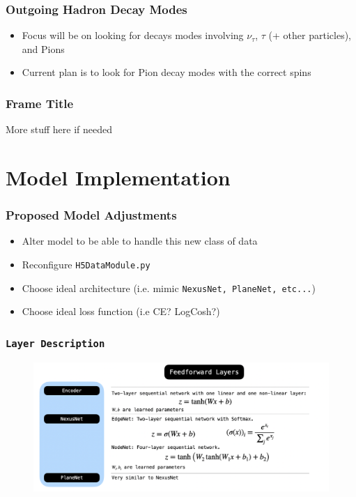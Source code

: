 \documentclass{beamer}
\begin{document}
\begin{frame}
\frametitle{Outgoing Hadron Decay Modes}
	\begin{itemize}
		\item Focus will be on looking for decays modes involving $\nu_{\tau}$, $\tau$ (+ other particles), and Pions
		\item Current plan is to look for Pion decay modes with the correct spins
	\end{itemize}
\end{frame}


\begin{frame}
    \frametitle{Frame Title}
    More stuff here if needed
\end{frame}


\section{Model Implementation}


\begin{frame}
\frametitle{Proposed Model Adjustments}
	\begin{itemize}
		\item Alter model to be able to handle this new class of data

		\item Reconfigure \texttt{H5DataModule.py}
		\item Choose ideal architecture (i.e. mimic \texttt{NexusNet, PlaneNet, etc...})
		\item Choose ideal loss function (i.e CE? LogCosh?)
	\end{itemize}
\end{frame}


\begin{frame}
	\frametitle{\texttt{Layer Description}}
		\begin{figure}[h!]
			\includegraphics[width=1\textwidth]{images/model3.png}
			\label{model3}
		\end{figure}
\end{frame}
\end{document}
